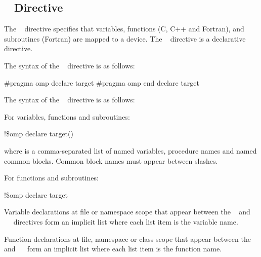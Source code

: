 \subsection{~ Directive}
\label{subsec:declare target Directive}
\summary
The ~ directive specifies that variables, functions (C, C++ and 
Fortran), and subroutines (Fortran) are mapped to a device. The ~ 
directive is a declarative directive.

\syntax
\ccppspecificstart
The syntax of the ~ directive is as follows:

\begin{boxedcode}
\#pragma omp declare target 
\#pragma omp end declare target 
\end{boxedcode}
\ccppspecificend

\fortranspecificstart
The syntax of the ~ directive is as follows:

For variables, functions and subroutines:

\begin{boxedcode}
!\$omp declare target()
\end{boxedcode}

where  is a comma-separated list of named variables, procedure names and named 
common blocks. Common block names must appear between slashes.

For functions and subroutines:

\begin{boxedcode}
!\$omp declare target 
\end{boxedcode}
\fortranspecificend

\descr
\ccppspecificstart
Variable declarations at file or namespace scope that appear between the ~ and ~~ directives form an implicit list where each list item is the variable name.

Function declarations at file, namespace or class scope that appear between the ~ and ~~ form an implicit list where each list item is the function name.
\ccppspecificend

